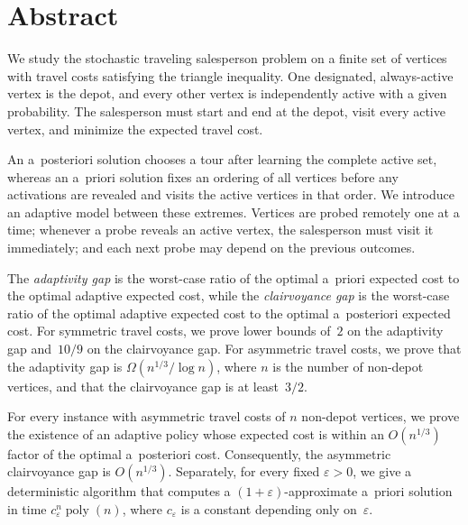 \documentclass[12pt,a4paper,oneside]{report}
\begin{document}


\maketitlepage
{}

\chapter*{Abstract}

We study the stochastic traveling salesperson problem on a finite set of
vertices with travel costs satisfying the triangle inequality.  One
designated, always-active vertex is the depot, and every other vertex is
independently active with a given probability.  The salesperson must start
and end at the depot, visit every active vertex, and minimize the expected
travel cost.

An a~posteriori solution chooses a tour after learning the complete active
set, whereas an a~priori solution fixes an ordering of all vertices before any
activations are revealed and visits the active vertices in that order.  We
introduce an adaptive model between these extremes.  Vertices are probed
remotely one at a time; whenever a probe reveals an active vertex, the
salesperson must visit it immediately; and each next probe may depend on the
previous outcomes.

The \emph{adaptivity gap} is the worst-case ratio of the optimal a~priori
expected cost to the optimal adaptive expected cost, while the
\emph{clairvoyance gap} is the worst-case ratio of the optimal adaptive
expected cost to the optimal a~posteriori expected cost.  For symmetric travel
costs, we prove lower bounds of~$2$ on the adaptivity gap and~$10/9$ on the
clairvoyance gap.   For asymmetric travel costs, we prove that the
adaptivity gap is $\Omega(n^{1/3}/\log n)$, where $n$ is the number of
non-depot vertices, and that the clairvoyance gap is at least~$3/2$.

For every instance with asymmetric travel costs of $n$ non-depot vertices, we prove the
existence of an adaptive policy whose expected cost is within an
$O(n^{1/3})$ factor of the optimal a~posteriori cost.  Consequently, the
asymmetric clairvoyance gap is $O(n^{1/3})$.  Separately, for every fixed
$\varepsilon>0$, we give a deterministic algorithm that computes a
$(1+\varepsilon)$-approximate a~priori solution in time
$c_\varepsilon^n\operatorname{poly}(n)$, where $c_\varepsilon$ is a constant
depending only on~$\varepsilon$.
\end{document}
